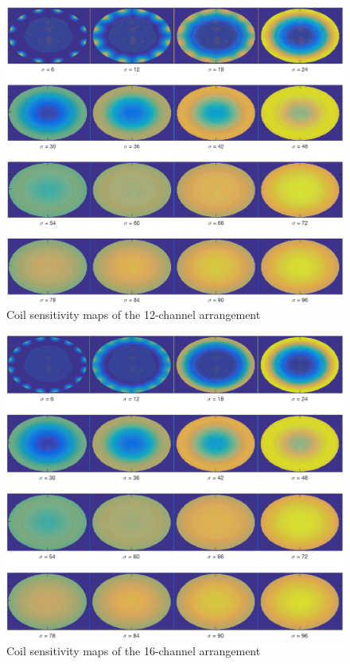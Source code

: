 \begin{figure}[H]
    \centering
    \includegraphics[width=.8\textwidth,keepaspectratio]{12coilsdifsigmas}
    \caption{Coil sensitivity maps of the 12-channel arrangement}
\end{figure}

\begin{figure}[H]
    \centering
    \includegraphics[width=.8\textwidth,keepaspectratio]{16coilsdifsigmas}
    \caption{Coil sensitivity maps of the 16-channel arrangement}
\end{figure}


